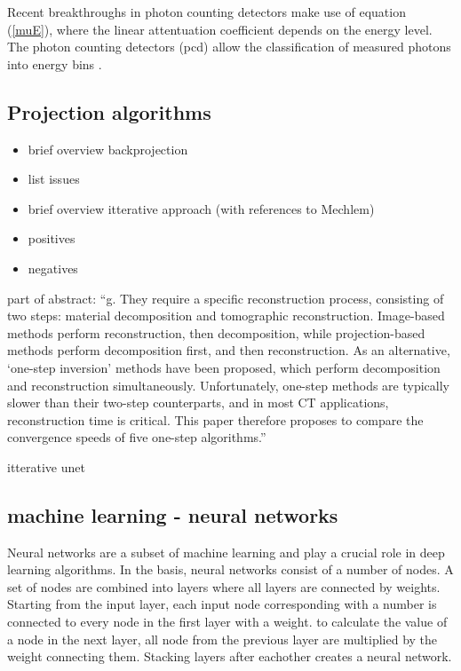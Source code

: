 \documentclass[9pt,Preprint]{lapreprint}
\begin{document}
Recent breakthroughs in photon counting detectors make use of equation (\ref{muE}), where the linear attentuation coefficient depends on the energy level. The photon counting detectors (pcd) allow the classification of measured photons into energy bins \parencite{pcd2022}.

\subsection{Projection algorithms}

\begin{itemize}
\item brief overview backprojection  \parencite{zeng2001image}


\item list issues


\item brief overview itterative approach (with references to Mechlem)


\item positives


\item negatives
\end{itemize}

part of abstract: ``g. They require a specific
reconstruction process, consisting of two steps: material decomposition and tomographic
reconstruction. Image-based methods perform reconstruction, then decomposition, while
projection-based methods perform decomposition first, and then reconstruction. As an alternative,
`one-step inversion' methods have been proposed, which perform decomposition and reconstruction
simultaneously. Unfortunately, one-step methods are typically slower than their two-step
counterparts, and in most CT applications, reconstruction time is critical. This paper therefore
proposes to compare the convergence speeds of five one-step algorithms.'' \parencite{mory2018comparison}

itterative unet \parencite{ge2023mb}

\subsection{machine learning - neural networks}

Neural networks are a subset of machine learning and play a crucial role in deep learning algorithms. In the basis, neural networks consist of a number of nodes. A set of nodes are combined into layers where all layers are connected by weights. Starting from the input layer, each input node corresponding with a number is connected to every node in the first layer with a weight. to calculate the value of a node in the next layer, all node from the previous layer are multiplied by the weight connecting them. Stacking layers after eachother creates a neural network.
\end{document}
